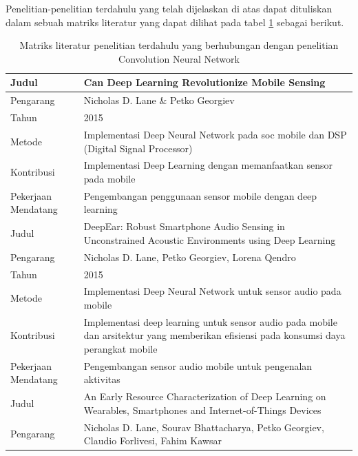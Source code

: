 Penelitian-penelitian terdahulu yang telah dijelaskan di atas dapat dituliskan dalam sebuah matriks literatur yang dapat dilihat pada tabel \ref{tab:tab1} sebagai berikut.
\begin{table}
	\clearpage
	\centering
	\caption{Matriks literatur penelitian terdahulu yang berhubungan dengan penelitian Convolution Neural Network}
	\label{tab:tab1}
	\begin{tabular}{ |m{2cm}|m{7cm}|m{1cm}|m{1cm}| } 	
		\hline	
		Judul & \multicolumn{3}{|m{13cm}|}{Can Deep Learning Revolutionize Mobile Sensing} \\
		\hline
		Pengarang & \multicolumn{3}{|m{13cm}|}{Nicholas D. Lane \& Petko Georgiev} \\ 
		\hline
		Tahun & \multicolumn{3}{|m{13cm}|}{2015} \\ 
		\hline
		Metode & \multicolumn{3}{|m{13cm}|}{Implementasi Deep Neural Network pada soc mobile dan DSP (Digital Signal Processor)}\\
		\hline
		Kontribusi  & \multicolumn{3}{|m{13cm}|}{Implementasi Deep Learning dengan memanfaatkan sensor pada mobile}\\ 
		\hline
		Pekerjaan Mendatang  & \multicolumn{3}{|m{13cm}|}{Pengembangan penggunaan sensor mobile dengan deep learning} \\
		\hline\hline
		Judul & \multicolumn{3}{|m{13cm}|}{DeepEar: Robust Smartphone Audio Sensing in Unconstrained Acoustic Environments using Deep Learning} \\
		\hline
		Pengarang & \multicolumn{3}{|m{13cm}|}{Nicholas D. Lane, Petko Georgiev, Lorena Qendro} \\ 
		\hline
		Tahun & \multicolumn{3}{|m{13cm}|}{2015} \\ 
		\hline
		Metode & \multicolumn{3}{|m{13cm}|}{Implementasi Deep Neural Network untuk sensor audio pada mobile}\\
		\hline
		Kontribusi  & \multicolumn{3}{|m{13cm}|}{Implementasi deep learning untuk sensor audio pada mobile dan arsitektur yang memberikan efisiensi pada konsumsi daya perangkat mobile}\\ 
		\hline
		Pekerjaan Mendatang  & \multicolumn{3}{|m{13cm}|}{Pengembangan sensor audio mobile untuk pengenalan aktivitas} \\
		\hline
		\hline\hline
		Judul & \multicolumn{3}{|m{13cm}|}{An Early Resource Characterization of Deep Learning on Wearables, Smartphones and Internet-of-Things Devices} \\
		\hline
		Pengarang & \multicolumn{3}{|m{13cm}|}{Nicholas D. Lane, Sourav Bhattacharya, Petko Georgiev, Claudio Forlivesi, Fahim Kawsar} \\ 

\end{tabular}
\end{table}
